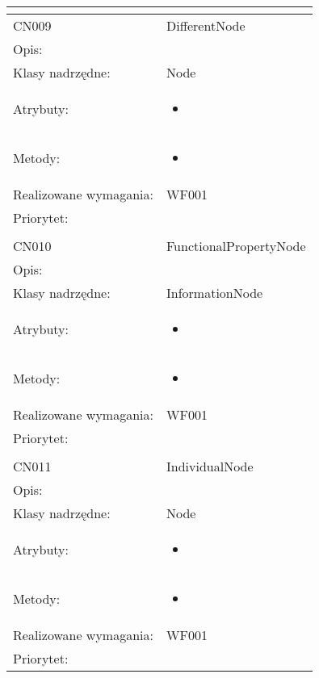 \documentclass[a4paper,10pt]{article}
\begin{document}
\begin{center}
\begin{longtable}{|m{3cm}|m{9cm}|}
\multicolumn{2}{c}{} \\
 \hline

CN009 & DifferentNode \\ \hline
Opis: &     \\ \hline
Klasy nadrzędne: & Node     \\ \hline
Atrybuty: & \begin{itemize}
 \item 
\end{itemize}
 \\ \hline
Metody: & \begin{itemize}
 \item 
\end{itemize}
  \\ \hline
Realizowane wymagania: & WF001 \\ \hline
Priorytet: &  \\ \hline

\multicolumn{2}{c}{} \\
 \hline

CN010 & FunctionalPropertyNode \\ \hline
Opis: &     \\ \hline
Klasy nadrzędne: & InformationNode     \\ \hline
Atrybuty: & \begin{itemize}
 \item 
\end{itemize}
 \\ \hline
Metody: & \begin{itemize}
 \item 
\end{itemize}
  \\ \hline
Realizowane wymagania: & WF001 \\ \hline
Priorytet: &  \\ \hline

\multicolumn{2}{c}{} \\
 \hline

CN011 & IndividualNode \\ \hline
Opis: &     \\ \hline
Klasy nadrzędne: & Node     \\ \hline
Atrybuty: & \begin{itemize}
 \item 
\end{itemize}
 \\ \hline
Metody: & \begin{itemize}
 \item 
\end{itemize}
  \\ \hline
Realizowane wymagania: & WF001 \\ \hline
Priorytet: &  \\ \hline


\end{longtable}
\end{center}
\end{document}
